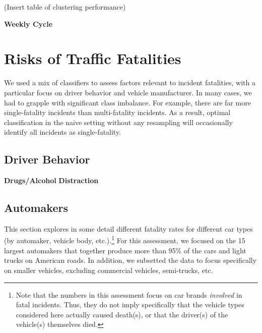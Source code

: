 \documentclass[11pt, oneside,titlepage]{article}   	%
\begin{document}
(Insert table of clustering performance)

\textbf{Weekly Cycle} \\

\section*{Risks of Traffic Fatalities}
We used a mix of classifiers to assess factors relevant to incident fatalities, with a particular focus on driver behavior and vehicle manufacturer. In many cases, we had to grapple with significant class imbalance. For example, there are far more single-fatality incidents than multi-fatality incidents. As a result, optimal classification in the naive setting without any resampling will occasionally identify all incidents as single-fatality.   

\subsection*{Driver Behavior}
\textbf{Drugs/Alcohol}
\textbf{Distraction}

\subsection*{Automakers}

This section explores in some detail different fatality rates for different car types (by automaker, vehicle body, etc.).\footnote{Note that the numbers in this assessment focus on car brands \textit{involved} in fatal incidents. Thus, they do not imply specifically that the vehicle types considered here actually caused death(s), or that the driver(s) of the vehicle(s) themselves died.} For this assessment, we focused on the 15 largest automakers that together produce more than 95\% of the cars and light trucks on American roads. In addition, we subsetted the data to focus specifically on smaller vehicles, excluding commercial vehicles, semi-trucks, etc. \\
\end{document}
